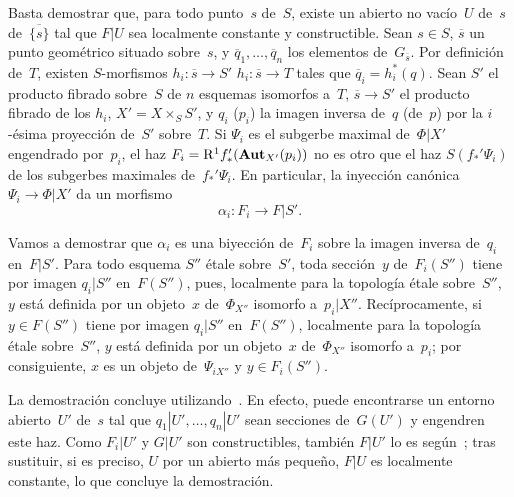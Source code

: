 Basta demostrar que, para todo punto~$s$ de~$S$, existe un abierto no
vacío~$U$
{de~$s$}
{de~$\overline{\{s\}}$}
tal que $F|U$ sea localmente constante y constructible.
Sean $s\in S$, $\overline{s}$ un punto geométrico situado sobre~$s$, y
$\overline{q}_1,\dots,\overline{q}_n$ los elementos de~$G_{\overline{s}}$.
Por definición de~$T$, existen $S$-morfismos
{$h_i\colon\overline{s}\to S'$}
{$h_i\colon\overline{s}\to T$}
tales que $\overline{q}_i=h_i^*(q)$. Sean $S'$ el producto fibrado
sobre~$S$ de $n$ esquemas isomorfos a~$T$, $\overline{s}\to S'$ el
producto fibrado de los $h_i$, $X'=X\times_SS'$, y $q_i$ (\resp $p_i$)
la imagen inversa de~$q$ (\resp de~$p$) por la $i$-ésima proyección
de~$S'$ sobre~$T$. Si $\Psi_i$ es el subgerbe maximal de~$\Phi|X'$
engendrado por~$p_i$, el haz
$F_i=\mathrm{R}^1f_*'(\operatorname{\mathbf{Aut}}_{X'}(p_i))$ no es otro que el haz
$S(f_*'\Psi_i)$ de los subgerbes maximales de~$f_*'\Psi_i$. En
particular, la inyección canónica $\Psi_i\to\Phi|X'$ da un morfismo
$$
\alpha_i\colon F_i\to F|S'.
$$

Vamos a demostrar que $\alpha_i$ es una biyección de~$F_i$ sobre la
imagen inversa de~$q_i$ en~$F|S'$. Para todo esquema $S''$ étale
sobre~$S'$, toda sección~$y$ de~$F_i(S'')$ tiene por imagen
$q_i|S''$ en~$F(S'')$, pues, localmente para la topología étale
sobre~$S''$, $y$ está definida por un objeto~$x$ de~$\Phi_{X''}$
isomorfo a~$p_i|X''$. Recíprocamente, si $y\in F(S'')$ tiene por imagen
$q_i|S''$ en~$F(S'')$, localmente para la topología étale sobre~$S''$,
$y$ está definida por un objeto~$x$ de~$\Phi_{X''}$ isomorfo a~$p_i$;
por consiguiente, $x$ es un objeto de~$\Psi_{iX''}$ y
$y\in F_i(S'')$.

La demostración concluye utilizando~. En efecto, puede
encontrarse un entorno abierto~$U'$ de~$s$ tal que
$q_1|U',\dots,q_n|U'$ sean secciones de~$G(U')$ y engendren este haz.
Como $F_i|U'$ y $G|U'$ son constructibles, también $F|U'$ lo es
según~; tras sustituir, si es preciso, $U$ por un
abierto más pequeño, $F|U$ es localmente constante, lo que concluye la
demostración.
